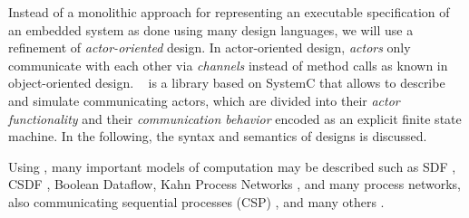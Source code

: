 %

 
Instead of a monolithic approach for representing an executable specification of an embedded system as done using many design languages, we will use a refinement of \emph{actor-oriented} design.
In actor-oriented design, \emph{actors} only communicate with each other via \emph{channels} instead of method calls as known
in object-oriented design.
\SysteMoC{}~\cite{fht:2006} is a library based on SystemC that allows to describe and simulate communicating actors, which are divided into their \emph{actor functionality} and their \emph{communication behavior} encoded as an explicit finite state machine.
In the following, the syntax and semantics of \SysteMoC{} designs is discussed.

Using \SysteMoC, many important models of computation may be described such as 
SDF \cite{Lee87b:1987}, CSDF \cite{belp:1996, eblp:1994}, Boolean Dataflow, 
Kahn Process Networks \cite{Kahn:1974}, 
and many process networks, also communicating sequential processes (CSP)
\cite{csphoare:1985}, and many others \cite{tszet:1999, LeeDenotialDF:1997,
embsft:2002, Lee98, Eker, Tei97}.


